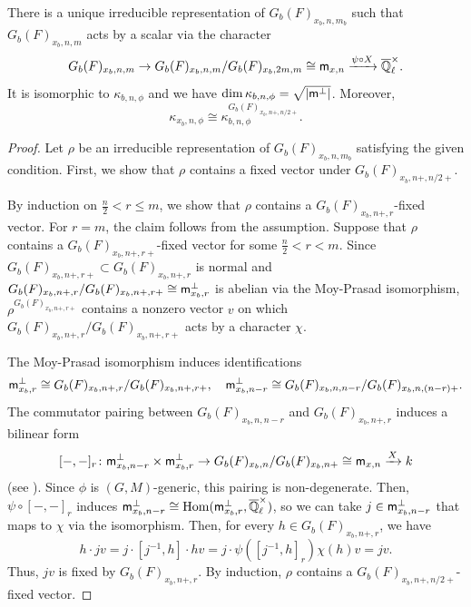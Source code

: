 \documentclass[12pt,reqno]{amsart}
\begin{document}
\begin{prop} \label{prop:Heisenberg_odd}
    There is a unique irreducible representation of $G_b(F)_{x_b, n, m_b}$ such that $G_b(F)_{x_b, n, m}$ acts by a scalar via the character 
    \[
        G_b(F)_{x_b, n, m} \to G_b(F)_{x_b, n, m} / G_b(F)_{x_b, 2m, m} \cong {\mathsf{m}}_{x, n} \xrightarrow{\psi \circ X} {\overline{\mathbb{Q}}_\ell^\times}. 
    \]
    It is isomorphic to $\kappa_{b, n, \phi}$ and we have $\dim \kappa_{b, n, \phi} = \sqrt{\lvert {\mathsf{m}}^\perp \rvert}$. Moreover, 
    \[
        \kappa_{x_b, n, \phi} \cong \kappa_{b, n, \phi}^{G_b(F)_{x_b, n+, n/2+}}. 
    \]
\end{prop}
\begin{proof}
    Let $\rho$ be an irreducible representation of $G_b(F)_{x_b, n, m_b}$ satisfying the given condition. First, we show that $\rho$ contains a fixed vector under $G_b(F)_{x_b, n+, n/2+}$. 

    By induction on $\tfrac{n}{2} < r \leq m$, we show that $\rho$ contains a $G_b(F)_{x_b, n+, r}$-fixed vector. For $r = m$, the claim follows from the assumption. Suppose that $\rho$ contains a $G_b(F)_{x_b, n+, r+}$-fixed vector for some $\tfrac{n}{2} < r < m$. Since $G_b(F)_{x_b, n+, r+} \subset G_b(F)_{x_b, n+, r}$ is normal and $G_b(F)_{x_b, n+, r} / G_b(F)_{x_b, n+, r+} \cong {\mathsf{m}}^\perp_{x_b, r}$ is abelian via the Moy-Prasad isomorphism, $\rho^{G_b(F)_{x_b, n+, r+}}$ contains a nonzero vector $v$ on which $G_b(F)_{x_b, n+, r} / G_b(F)_{x_b, n+, r+}$ acts by a character $\chi$. 

    The Moy-Prasad isomorphism induces identifications 
    \[
        {\mathsf{m}}^\perp_{x_b, r} \cong G_b(F)_{x_b, n+, r} / G_b(F)_{x_b, n+, r+} ,\quad 
        {\mathsf{m}}^\perp_{x_b, n - r} \cong G_b(F)_{x_b, n, n - r} / G_b(F)_{x_b, n, (n - r)+}. 
    \]
    The commutator pairing between $G_b(F)_{x_b, n, n - r}$ and $G_b(F)_{x_b, n+, r}$ induces a bilinear form
    \[      
        [-, -]_r \colon {\mathsf{m}}^\perp_{x_b, n - r} \times {\mathsf{m}}^\perp_{x_b, r} \to G_b(F)_{x_b, n} / G_b(F)_{x_b, n+} \cong {\mathsf{m}}_{x, n} \xrightarrow{X} k
    \]
    (see \cite[Proposition 13.2.5]{KP23}). Since $\phi$ is $(G, M)$-generic, this pairing is non-degenerate. Then, $\psi \circ [-, -]_r$ induces ${\mathsf{m}}^\perp_{x_b, n - r} \cong {\operatorname{Hom}}({\mathsf{m}}^\perp_{x_b, r}, {\overline{\mathbb{Q}}_\ell^\times})$, so we can take $j \in {\mathsf{m}}^\perp_{x_b, n - r}$ that maps to $\chi$ via the isomorphism. Then, for every $h \in G_b(F)_{x_b, n+, r}$, we have 
    \[
        h \cdot jv = j\cdot [j^{-1}, h] \cdot hv = j \cdot \psi([j^{-1}, h]_r) \chi(h) v = jv. 
    \]
    Thus, $jv$ is fixed by $G_b(F)_{x_b, n+, r}$. By induction, $\rho$ contains a $G_b(F)_{x_b, n+, n/2+}$-fixed vector. 
    

\end{proof}
\end{document}
